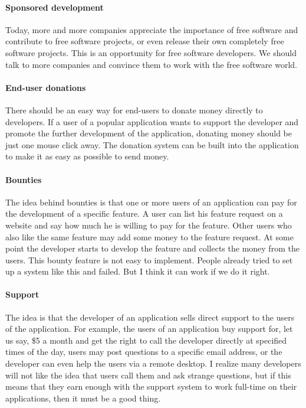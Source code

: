 \paragraph*{Sponsored development}

Today, more and more companies appreciate the importance of free software and
contribute to free software projects, or even release their own completely free
software projects. This is an opportunity for free software developers. We
should talk to more companies and convince them to work with the free software
world. 

\paragraph*{End-user donations}

There should be an easy way for end-users to donate money directly to
developers. If a user of a popular application wants to support the developer
and promote the further development of the application, donating money should be
just one mouse click away. The donation system can be built into the application
to make it as easy as possible to send money.

\paragraph*{Bounties}

The idea behind bounties is that one or more users of an application can pay for
the development of a specific feature. A user can list his feature request on a
website and say how much he is willing to pay for the feature. Other users who
also like the same feature may add some money to the feature request. At some
point the developer starts to develop the feature and collects the money from
the users. This bounty feature is not easy to implement. People already tried to
set up a system like this and failed. But I think it can work if we do it
right. 

\paragraph*{Support}

The idea is that the developer of an application sells direct support to the
users of the application. For example, the users of an application buy support
for, let us say, \$5 a month and get the right to call the developer directly at
specified times of the day, users may post questions to a specific email
address, or the developer can even help the users via a remote desktop. I
realize many developers will not like the idea that users call them and ask
strange questions, but if this means that they earn enough with the support
system to work full-time on their applications, then it must be a good thing.

